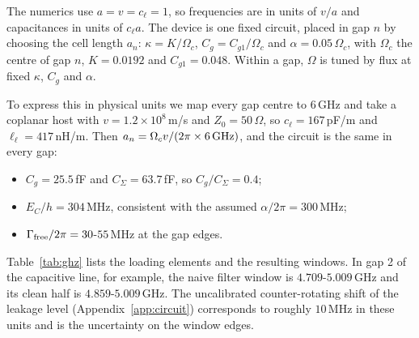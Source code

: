 \documentclass[aps,prresearch,twocolumn,superscriptaddress,nofootinbib,longbibliography,floatfix]{revtex4-2}
\begin{document}
The numerics use $a=v=c_\ell=1$, so frequencies are in units of $v/a$ and capacitances in units of $c_\ell a$. The device is
one fixed circuit, placed in gap $n$ by choosing the cell length $a_n$:
$\kappa=K/\Omega_c$, $C_g=C_{g1}/\Omega_c$ and $\alpha=0.05\,\Omega_c$, with $\Omega_c$ the centre of gap $n$, $K=0.0192$ and
$C_{g1}=0.048$. Within a gap, $\Omega$ is tuned by flux at fixed $\kappa$, $C_g$ and $\alpha$.

To express this in physical units we map every gap centre to $6$\,GHz and take a coplanar host with $v=1.2\times10^8$\,m/s
and $Z_0=50\,\Omega$, so $c_\ell=167$\,pF/m and $\ell_\ell=417$\,nH/m. Then $a_n=\Omega_c v/(2\pi\times6\,{\rm GHz})$, and
the circuit is the same in every gap:
\begin{itemize}
\item $C_g=25.5$\,fF and $C_\Sigma=63.7$\,fF, so $C_g/C_\Sigma=0.4$;
\item $E_C/h=304$\,MHz, consistent with the assumed $\alpha/2\pi=300$\,MHz;
\item $\Gamma_{\rm free}/2\pi=30$-$55$\,MHz at the gap edges.
\end{itemize}
Table~\ref{tab:ghz} lists the loading elements and the resulting windows. In gap 2 of the capacitive line, for example,
the naive filter window is $4.709$-$5.009$\,GHz and its clean half is $4.859$-$5.009$\,GHz. The uncalibrated
counter-rotating shift of the leakage level (Appendix~\ref{app:circuit}) corresponds to roughly $10$\,MHz in these
units and is the uncertainty on the window edges.
\end{document}
